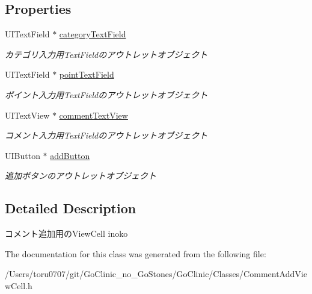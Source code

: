 \subsection*{Properties}
\begin{DoxyCompactItemize}
\item 
\hypertarget{interface_comment_add_view_cell_ac73ce68c06e264f6f38a82d8be6cac34}{
UITextField $\ast$ \hyperlink{interface_comment_add_view_cell_ac73ce68c06e264f6f38a82d8be6cac34}{categoryTextField}}
\label{interface_comment_add_view_cell_ac73ce68c06e264f6f38a82d8be6cac34}

\begin{DoxyCompactList}\small\item\em カテゴリ入力用TextFieldのアウトレットオブジェクト \end{DoxyCompactList}\item 
\hypertarget{interface_comment_add_view_cell_ab6b266265e3ee3658c01f7fc681d1ce9}{
UITextField $\ast$ \hyperlink{interface_comment_add_view_cell_ab6b266265e3ee3658c01f7fc681d1ce9}{pointTextField}}
\label{interface_comment_add_view_cell_ab6b266265e3ee3658c01f7fc681d1ce9}

\begin{DoxyCompactList}\small\item\em ポイント入力用TextFieldのアウトレットオブジェクト \end{DoxyCompactList}\item 
\hypertarget{interface_comment_add_view_cell_ade91f1674e2bcc62f98ba29c14f61a1c}{
UITextView $\ast$ \hyperlink{interface_comment_add_view_cell_ade91f1674e2bcc62f98ba29c14f61a1c}{commentTextView}}
\label{interface_comment_add_view_cell_ade91f1674e2bcc62f98ba29c14f61a1c}

\begin{DoxyCompactList}\small\item\em コメント入力用TextFieldのアウトレットオブジェクト \end{DoxyCompactList}\item 
\hypertarget{interface_comment_add_view_cell_a3f06c6ae7c58ca4a1731ac85c3d38e8b}{
UIButton $\ast$ \hyperlink{interface_comment_add_view_cell_a3f06c6ae7c58ca4a1731ac85c3d38e8b}{addButton}}
\label{interface_comment_add_view_cell_a3f06c6ae7c58ca4a1731ac85c3d38e8b}

\begin{DoxyCompactList}\small\item\em 追加ボタンのアウトレットオブジェクト \end{DoxyCompactList}\end{DoxyCompactItemize}


\subsection{Detailed Description}
コメント追加用のViewCell  inoko 

The documentation for this class was generated from the following file:\begin{DoxyCompactItemize}
\item 
/Users/toru0707/git/GoClinic\_\-no\_\-GoStones/GoClinic/Classes/CommentAddViewCell.h\end{DoxyCompactItemize}
